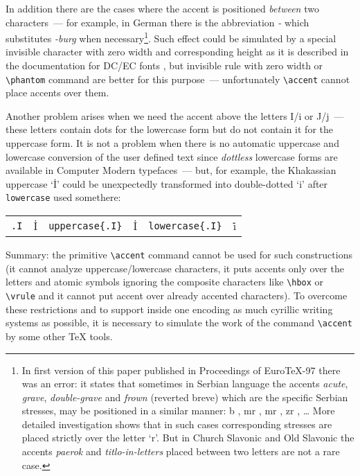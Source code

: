 In addition there are the cases
where the accent is positioned {\em between} two characters~---
for example, in German \cite{DC} there is the abbreviation
\textit{-\burg} which substitutes \textit{-burg}
when necessary\footnote{In first version of this paper
published in Proceedings of Euro\TeX-97 there was an error:
it states that sometimes in Serbian language
the accents {\em acute}, {\em grave}, {\em double-grave}
and {\em frown} (reverted breve) which are the specific
Serbian stresses, may be positioned in a similar manner:
{\cmfont
{\cyrfont b}%
},
{\cmfont
{\cyrfont mr}%
},
{\cmfont
{\cyrfont mr}%
},
{\cmfont
{\cyrfont zr}%
},
\dots
More detailed investigation shows that in such cases
corresponding stresses are placed strictly over the letter
`{\cyrfont r}'. But in Church Slavonic and Old Slavonic
the accents {\em paerok} and {\em titlo-in-letters}
placed between two letters are not a rare case.}.
Such effect could be simulated by a special invisible character
with zero width and corresponding height
as it is described in the documentation for DC/EC fonts \cite{DC},
but invisible rule with zero width or
\verb?\phantom? command are better for this purpose~---
unfortunately \verb?\accent? cannot place accents over them.

Another problem arises when we need the accent above the letters
I/i or J/j~--- these letters contain dots for the lowercase form
but do not contain it for the uppercase form. It is not a problem
when there is no automatic uppercase and lowercase conversion
of the user defined text since {\em dottless} lowercase forms
are available in Computer Modern typefaces~---
but, for example, the Khakassian uppercase `\.I'
could be unexpectedly transformed into
double-dotted `i' after {\tt\bs{}lowercase} used somethere:
\begin{center}
\begin{tabular}{c@{ = }cc@{ = }cc@{ = }c}
{\tt\bs{}.I} &  \.I
&
{\tt\bs{}uppercase\{\bs{}.I\}} & \uppercase{\.I}
&
{\tt\bs{}lowercase\{\bs{}.I\}} & \lowercase{\.I}
\end{tabular}
\end{center}

Summary: the primitive \verb?\accent? command cannot
be used for such constructions
(it cannot analyze uppercase/lowercase characters,
it puts accents only over the letters
and atomic symbols ignoring the composite characters
like \verb?\hbox? or \verb?\vrule? and it cannot
put accent over already accented characters).
To overcome these restrictions and to support inside one encoding
as much cyrillic writing systems as possible, it is necessary
to simulate the work of the command \verb?\accent?
by some other \TeX{} tools.

